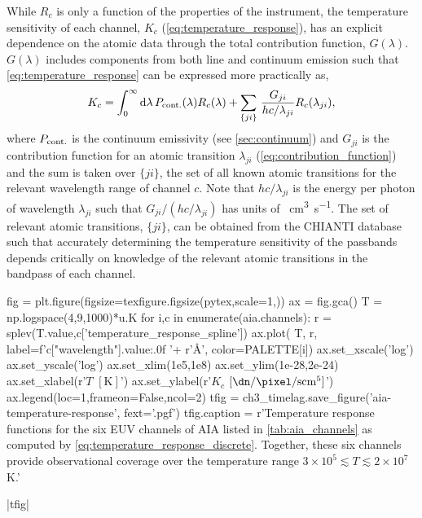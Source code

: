 While $R_c$ is only a function of the properties of the instrument, the temperature sensitivity of each channel, $K_c$ (\autoref{eq:temperature_response}), has an explicit dependence on the atomic data through the total contribution function, $G(\lambda)$. $G(\lambda)$ includes components from both line and continuum emission such that \autoref{eq:temperature_response} can be expressed more practically as,
\begin{equation}\label{eq:temperature_response_discrete}
    K_c = \int_0^\infty\textup{d}\lambda\,P_{\textup{cont.}}(\lambda)R_c(\lambda)  + \sum_{\{ji\}}\,\frac{G_{ji}}{hc/\lambda_{ji}}R_c(\lambda_{ji}),
\end{equation}
where $P_{\textup{cont.}}$ is the continuum emissivity (see \autoref{sec:continuum}) and $G_{ji}$ is the contribution function for an atomic transition $\lambda_{ji}$ (\autoref{eq:contribution_function}) and the sum is taken over $\{ji\}$, the set of all known atomic transitions for the relevant wavelength range of channel $c$. Note that $hc/\lambda_{ji}$ is the energy per photon of wavelength $\lambda_{ji}$ such that $G_{ji}/(hc/\lambda_{ji})$ has units of \si{\photon\cubic\cm\per\second}. The set of relevant atomic transitions, $\{ji\}$, can be obtained from the CHIANTI database such that accurately determining the temperature sensitivity of the passbands depends critically on knowledge of the relevant atomic transitions in the bandpass of each channel.

\begin{pycode}
fig = plt.figure(figsize=texfigure.figsize(pytex,scale=1,))
ax = fig.gca()
T = np.logspace(4,9,1000)*u.K
for i,c in enumerate(aia.channels):
    r = splev(T.value,c['temperature_response_spline'])
    ax.plot(
        T, r,
        label=f'{c["wavelength"].value:.0f} '+ r'$\si{\angstrom}$',
        color=PALETTE[i])
ax.set_xscale('log')
ax.set_yscale('log')
ax.set_xlim(1e5,1e8)
ax.set_ylim(1e-28,2e-24)
ax.set_xlabel(r'$T$ $[\si{\kelvin}]$')
ax.set_ylabel(r'$K_c$ $[\si{\dn\per\pixel\per\second\cm\tothe{5}}]$')
ax.legend(loc=1,frameon=False,ncol=2)
tfig = ch3_timelag.save_figure('aia-temperature-response', fext='.pgf')
tfig.caption = r'Temperature response functions for the six EUV channels of AIA listed in \autoref{tab:aia_channels} as computed by \autoref{eq:temperature_response_discrete}. Together, these six channels provide observational coverage over the temperature range $3\times10^5\lesssim T\lesssim2\times10^7$ \si{\kelvin}.'
\end{pycode}
|tfig|

